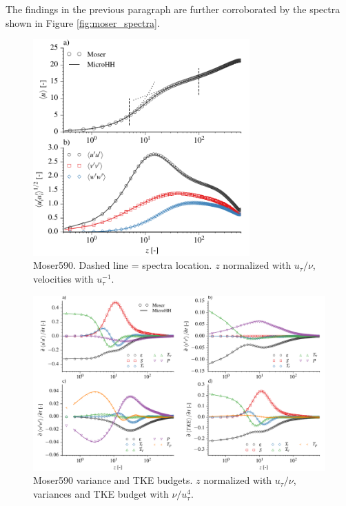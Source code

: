 \documentclass[gmd]{copernicus}
\begin{document}
The findings in the previous paragraph are further corroborated by the spectra shown in Figure \ref{fig:moser_spectra}.  

\begin{figure}[t]
\vspace*{2mm}
\begin{center}
\includegraphics[width=8.3cm]{figs/gmd_m590_umean_var.pdf}
\end{center}
\caption{Moser590. Dashed line = spectra location. $z$ normalized with $u_\tau / \nu$, velocities with $u_\tau^{-1}$.}\label{fig:moser_velocity}
\end{figure}

\begin{figure}[t]
\vspace*{2mm}
\begin{center}
\includegraphics[width=16.6cm]{figs/gmd_m590_turb_budg.pdf}
\end{center}
\caption{Moser590 variance and TKE budgets. $z$ normalized with $u_\tau / \nu$, variances and TKE budget with $\nu / u_\tau^{4}$.}\label{fig:moser_variance}
\end{figure}
\end{document}
